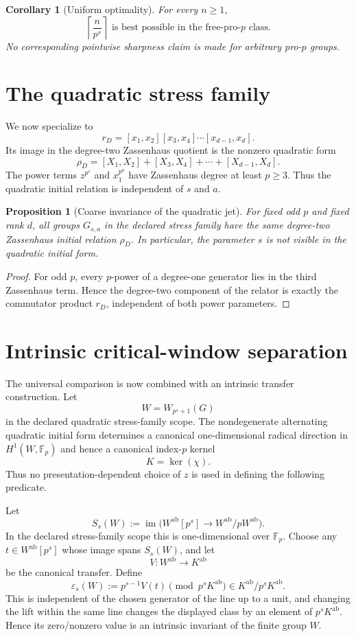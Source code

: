 \documentclass[11pt]{article}
\newtheorem{proposition}[theorem]{Proposition}
\newtheorem{corollary}[theorem]{Corollary}
\newcommand{\Fp}{\mathbb F_p}
\begin{document}
\begin{corollary}[Uniform optimality]
For every $n\ge1$,
\[
\boxed{
\left\lceil\frac n{p^s}\right\rceil
\text{ is best possible in the free-pro-}p\text{ class}.
}
\]
No corresponding pointwise sharpness claim is made for arbitrary
pro-$p$ groups.
\end{corollary}

\section{The quadratic stress family}

We now specialize to
\[
r_D=[x_1,x_2][x_3,x_4]\cdots[x_{d-1},x_d].
\]
Its image in the degree-two Zassenhaus quotient is the nonzero quadratic
form
\[
\rho_D=[X_1,X_2]+[X_3,X_4]+\cdots+[X_{d-1},X_d].
\]
The power terms \(z^{p^s}\) and \(x_1^{p^a}\) have Zassenhaus degree at
least \(p\ge3\).  Thus the quadratic initial relation is independent of
$s$ and $a$.

\begin{proposition}[Coarse invariance of the quadratic jet]
For fixed odd \(p\) and fixed rank \(d\), all groups \(G_{s,a}\) in the
declared stress family have the same degree-two Zassenhaus initial
relation \(\rho_D\).  In particular, the parameter \(s\) is not visible
in the quadratic initial form.
\end{proposition}

\begin{proof}
For odd \(p\), every $p$-power of a degree-one generator lies in the
third Zassenhaus term.  Hence the degree-two component of the relator is
exactly the commutator product \(r_D\), independent of both power
parameters.
\end{proof}

\section{Intrinsic critical-window separation}

The universal comparison is now combined with an intrinsic transfer
construction.  Let
\[
W=W_{p^s+1}(G)
\]
in the declared quadratic stress-family scope.  The nondegenerate
alternating quadratic initial form determines a canonical one-dimensional
radical direction in $H^1(W,\Fp)$ and hence a canonical index-$p$
kernel
\[
K=\ker(\chi).
\]
Thus no presentation-dependent choice of $z$ is used in defining the
following predicate.

Let
\[
S_s(W):=
\operatorname{im}\bigl(
W^{\mathrm{ab}}[p^s]\longrightarrow
W^{\mathrm{ab}}/pW^{\mathrm{ab}}
\bigr).
\]
In the declared stress-family scope this is one-dimensional over
$\Fp$.  Choose any
$t\in W^{\mathrm{ab}}[p^s]$ whose image spans $S_s(W)$, and let
\[
V:W^{\mathrm{ab}}\longrightarrow K^{\mathrm{ab}}
\]
be the canonical transfer.  Define
\[
\boxed{
\varepsilon_s(W):=
p^{s-1}V(t)
\pmod{p^sK^{\mathrm{ab}}}
\in K^{\mathrm{ab}}/p^sK^{\mathrm{ab}}.
}
\tag{$\varepsilon_s$}
\]
This is independent of the chosen generator of the line up to a unit,
and changing the lift within the same line changes the displayed class
by an element of $p^sK^{\mathrm{ab}}$.  Hence its zero/nonzero value is
an intrinsic invariant of the finite group $W$.
\end{document}
